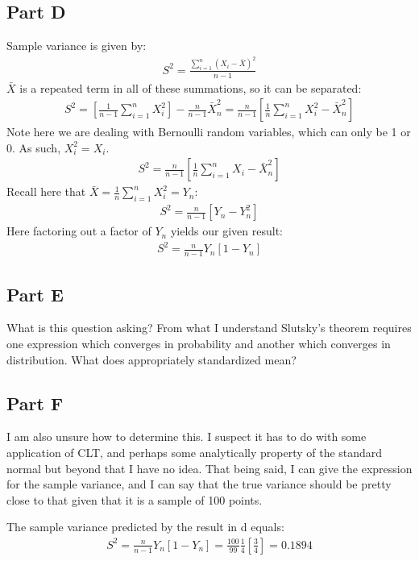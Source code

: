 \documentclass{article}
\begin{document}
\subsection*{Part D}
Sample variance is given by:
\begin{align*}
S^2 = \frac{\sum_{i=1}^{n} (X_i-\bar{X})^2}{n-1}
\end{align*}
$\bar{X}$ is a repeated term in all of these summations, so it can be separated:
\begin{align*}
S^2 = [\frac{1}{n-1} \sum_{i=1}^{n} X_i^2] - \frac{n}{n-1} \bar{X}^2_n = \frac{n}{n-1} [\frac{1}{n} \sum_{i=1}^{n} X_i^2-\bar{X}_n^2]
\end{align*}
Note here we are dealing with Bernoulli random variables, which can only be 1 or 0. As such, $X_i^2=X_i$.
\begin{align*}
S^2 = \frac{n}{n-1} [\frac{1}{n} \sum_{i=1}^{n} X_i-\bar{X}_n^2]
\end{align*}
Recall here that $\bar{X}=\frac{1}{n} \sum_{i=1}^{n} X_i^2 = Y_n$:
\begin{align*}
S^2 = \frac{n}{n-1} [Y_n-Y_n^2]
\end{align*}
Here factoring out a factor of $Y_n$ yields our given result:
\begin{align*}
\boxed{ S^2 = \frac{n}{n-1} Y_n[1-Y_n] }
\end{align*}

\subsection*{Part E}
%
What is this question asking? From what I understand Slutsky's theorem requires one expression which converges in probability and another which converges in distribution. What does appropriately standardized mean?



\subsection*{Part F}
%
I am also unsure how to determine this. I suspect it has to do with some application of CLT, and perhaps some analytically property of the standard normal but beyond that I have no idea. That being said, I can give the expression for the sample variance, and I can say that the true variance should be pretty close to that given that it is a sample of 100 points.


The sample variance predicted by the result in d equals:
\begin{align*}
\boxed{ S^2 = \frac{n}{n-1} Y_n[1-Y_n] = \frac{100}{99} \tfrac{1}{4}[\frac{3}{4}] = 0.1894 }
\end{align*}
\clearpage
\end{document}
